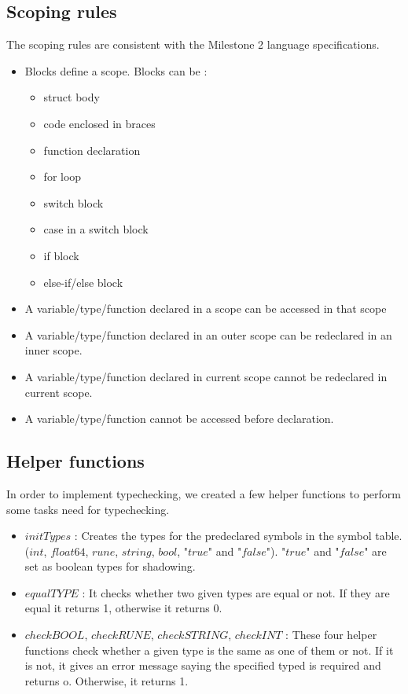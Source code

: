 \documentclass[preprint,12pt]{elsarticle}
\begin{document}
\subsection{Scoping rules}
The scoping rules are consistent with the Milestone 2 language specifications.
\begin{itemize}
\item Blocks define a scope. Blocks can be : 
\begin{itemize}
\item struct body
\item code enclosed in braces
\item function declaration
\item for loop
\item switch block
\item case in a switch block
\item if block 
\item else-if/else block
\end{itemize} 
\item A variable/type/function declared in a scope can be accessed in that scope
\item A variable/type/function declared in an outer scope can be redeclared in an inner scope.
\item A variable/type/function declared in current scope cannot be redeclared in current scope.
\item A variable/type/function cannot be accessed before declaration. 
\end{itemize}

\subsection{Helper functions}

In order to implement typechecking, we created a few helper functions to perform some tasks need for typechecking.
\begin{itemize}
\item $initTypes$ : Creates the types for the predeclared symbols in the symbol table. ($int$, $float64$, $rune$, $string$, $bool$, "$true$" and "$false$"). "$true$" and "$false$" are set as boolean types for shadowing.
\item $equalTYPE$ : It checks whether two given types are equal or not. If they are equal it returns 1, otherwise it returns 0.
\item $checkBOOL$, $checkRUNE$, $checkSTRING$, $checkINT$ : These four helper functions check whether a given type is the same as one of them or not. If it is not, it gives an error message saying the specified typed is required and returns o. Otherwise, it returns 1.
\end{itemize}
\end{document}
